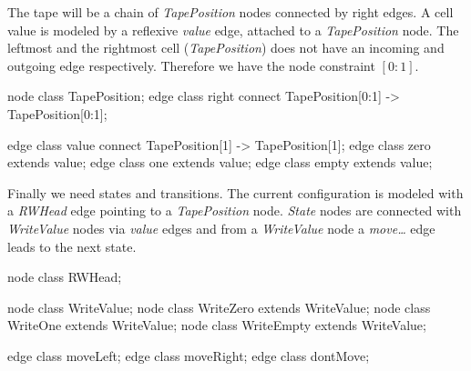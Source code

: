 The tape will be a chain of \emph{TapePosition} nodes connected by right edges. A cell value is modeled by a reflexive \emph{value} edge, attached to a \emph{TapePosition} node. The leftmost and the rightmost cell (\emph{TapePosition}) does not have an incoming and outgoing edge respectively. Therefore we have the node constraint $[0:1]$.
\begin{grgen}[firstnumber=last]
node class TapePosition; 
edge class right
  connect TapePosition[0:1] -> TapePosition[0:1];
  
edge class value
  connect TapePosition[1] -> TapePosition[1];  
edge class zero extends value;
edge class one extends value;
edge class empty extends value;

\end{grgen}
Finally we need states and transitions. The current configuration is modeled with a \emph{RWHead} edge pointing to a \emph{TapePosition} node. \emph{State} nodes are connected with \emph{WriteValue} nodes via \emph{value} edges and from a \emph{WriteValue} node a \emph{move\dots} edge leads to the next state.
\begin{grgen}[firstnumber=last]
node class RWHead;

node class WriteValue;
node class WriteZero extends WriteValue;
node class WriteOne extends WriteValue;
node class WriteEmpty extends WriteValue; 

edge class moveLeft;
edge class moveRight;
edge class dontMove;

\end{grgen}

